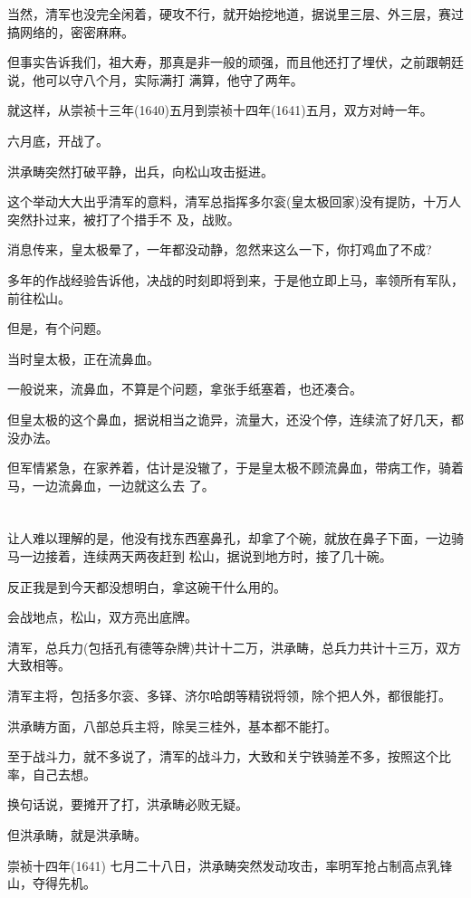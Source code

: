 \documentclass[11pt,a4paper,onecolumn]{article}
\begin{document}
当然，清军也没完全闲着，硬攻不行，就开始挖地道，据说里三层、外三层，赛过搞网络的，密密麻麻。

但事实告诉我们，祖大寿，那真是非一般的顽强，而且他还打了埋伏，之前跟朝廷说，他可以守八个月，实际满打
满算，他守了两年。

就这样，从崇祯十三年(1640)五月到崇祯十四年(1641)五月，双方对峙一年。

六月底，开战了。

洪承畴突然打破平静，出兵，向松山攻击挺进。

这个举动大大出乎清军的意料，清军总指挥多尔衮(皇太极回家)没有提防，十万人突然扑过来，被打了个措手不
及，战败。

消息传来，皇太极晕了，一年都没动静，忽然来这么一下，你打鸡血了不成?

多年的作战经验告诉他，决战的时刻即将到来，于是他立即上马，率领所有军队，前往松山。

但是，有个问题。

当时皇太极，正在流鼻血。

一般说来，流鼻血，不算是个问题，拿张手纸塞着，也还凑合。

但皇太极的这个鼻血，据说相当之诡异，流量大，还没个停，连续流了好几天，都没办法。

但军情紧急，在家养着，估计是没辙了，于是皇太极不顾流鼻血，带病工作，骑着马，一边流鼻血，一边就这么去
了。

\section[\thesection]{}

让人难以理解的是，他没有找东西塞鼻孔，却拿了个碗，就放在鼻子下面，一边骑马一边接着，连续两天两夜赶到
松山，据说到地方时，接了几十碗。

反正我是到今天都没想明白，拿这碗干什么用的。

会战地点，松山，双方亮出底牌。

清军，总兵力(包括孔有德等杂牌)共计十二万，洪承畴，总兵力共计十三万，双方大致相等。

清军主将，包括多尔衮、多铎、济尔哈朗等精锐将领，除个把人外，都很能打。

洪承畴方面，八部总兵主将，除吴三桂外，基本都不能打。

至于战斗力，就不多说了，清军的战斗力，大致和关宁铁骑差不多，按照这个比率，自己去想。

换句话说，要摊开了打，洪承畴必败无疑。

但洪承畴，就是洪承畴。

崇祯十四年(1641) 七月二十八日，洪承畴突然发动攻击，率明军抢占制高点乳锋山，夺得先机。
\end{document}
